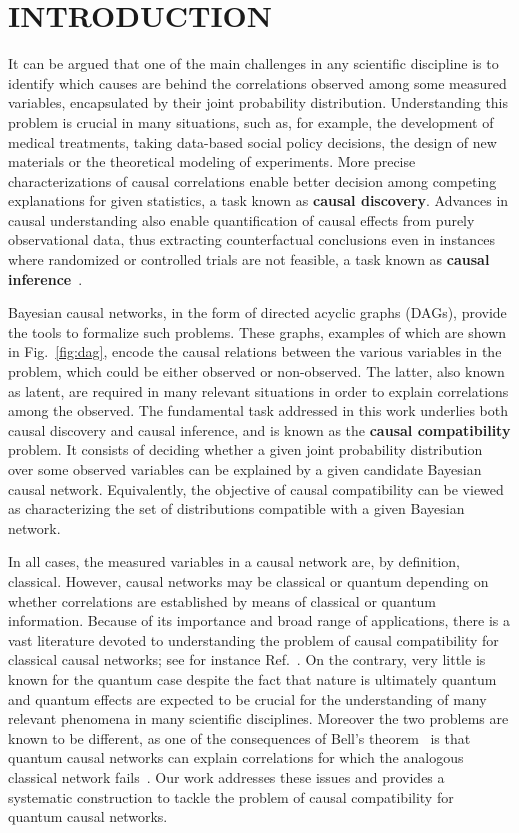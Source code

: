 \documentclass[superscriptaddress,aps,prx,nofootinbib,twocolumn,twoside,reprint,letterpaper,longbibliography]{revtex4-2}
\newcommand{\term}[1]{\textcolor{medblue}{\textbf{#1}}}
\begin{document}
\section{INTRODUCTION}
It can be argued that one of the main challenges in any scientific discipline is to identify which causes are behind the correlations observed among some measured variables, encapsulated by their joint probability distribution.
Understanding this problem is crucial in many situations, such as, for example, the development of medical treatments, taking data-based social policy decisions, the design of new materials or the theoretical modeling of experiments. More precise characterizations of causal correlations enable better decision among competing explanations for given statistics, a task known as \term{causal discovery}. Advances in causal understanding also enable quantification of causal effects from purely observational data, thus extracting counterfactual conclusions even in instances where randomized or controlled trials are not feasible, a task known as \term{causal inference}~\cite{pearl,morgan2007counterfactuals,ShpitserPearlIdentification}.

Bayesian causal networks, in the form of directed acyclic graphs (DAGs), provide the tools to formalize such problems.
These graphs, examples of which are shown in Fig.~\ref{fig:dag}, encode the causal relations between the various variables in the problem, which could be either observed or non-observed.
The latter, also known as latent, are required in many relevant situations in order to explain correlations among the observed.
The fundamental task addressed in this work underlies both causal discovery and causal inference, and is known as the \term{causal compatibility} problem. It consists of deciding whether a given joint probability distribution over some observed variables can be explained by a given candidate Bayesian causal network. Equivalently, the objective of causal compatibility can be viewed as characterizing the set of distributions compatible with a given Bayesian network.

In all cases, the measured variables in a causal network are, by definition, classical. However, causal networks may be classical or quantum depending on whether correlations are established by means of classical or quantum information. Because of its importance and broad range of applications, there is a vast literature devoted to understanding the problem of causal compatibility for classical causal networks; see for instance Ref.~\cite{pearl}.
On the contrary, very little is known for the quantum case despite the fact that nature is ultimately quantum and quantum effects are expected to be crucial for the understanding of many relevant phenomena in many scientific disciplines.
Moreover the two problems are known to be different, as one of the consequences of Bell's theorem~\cite{Bell66,BellReview} is that quantum causal networks can explain correlations for which the analogous classical network fails~\cite{fritz2012bell,HLP,Wood2015,Chaves2015relaxing,WolfeBellQuantified}.
Our work addresses these issues and provides a systematic construction to tackle the problem of causal compatibility for quantum causal networks.
\end{document}
